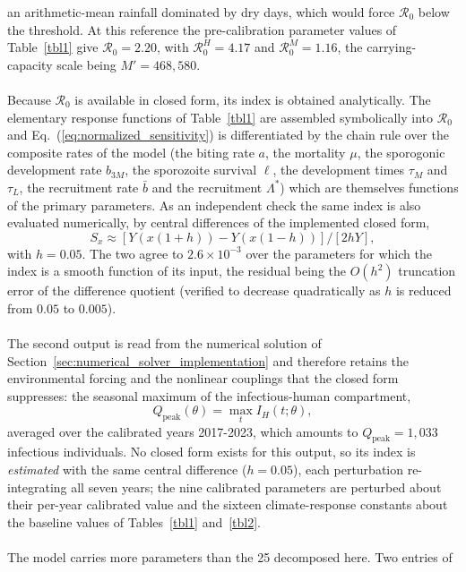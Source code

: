 \documentclass[a4paper,fleqn]{cas-dc}
\begin{document}
an arithmetic-mean rainfall dominated by dry days, which would force
$\mathcal{R}_0$ below the threshold. At this reference the pre-calibration
parameter values of Table~\ref{tbl1} give $\mathcal{R}_0 = 2.20$, with
$\mathcal{R}_0^H = 4.17$ and $\mathcal{R}_0^M = 1.16$, the
carrying-capacity scale being $M' = 468{,}580$.
\\\\
Because $\mathcal{R}_0$ is available in closed form, its index is obtained
analytically. The elementary response functions of
Table~\ref{tbl1} are assembled symbolically into $\mathcal{R}_0$ and
Eq.~(\ref{eq:normalized_sensitivity}) is differentiated by the chain rule
over the composite rates of the model (the biting rate $a$, the mortality
$\mu$, the sporogonic development rate $b_{3M}$, the sporozoite survival
$\ell$, the development times $\tau_M$ and $\tau_L$, the recruitment rate
$\bar{b}$ and the recruitment $\Lambda^*$) which are themselves functions
of the primary parameters. As an independent check the same index is also
evaluated numerically, by central differences of the implemented closed form,
$$S_x \approx [Y(x(1+h)) - Y(x(1-h))]/[2hY],$$ with $h = 0.05$. The two agree to
$2.6\times 10^{-3}$ over the parameters for which the index is a smooth
function of its input, the residual being the $O(h^2)$ truncation error of
the difference quotient (verified to decrease quadratically as $h$ is
reduced from $0.05$ to $0.005$).
\\\\
The second output is read from the numerical solution of
Section~\ref{sec:numerical_solver_implementation} and therefore retains the
environmental forcing and the nonlinear couplings that the closed form
suppresses: the seasonal maximum of the infectious-human compartment,
\begin{equation}
Q_{\mathrm{peak}}(\theta)=\max_{t} I_H(t;\theta),
\label{eq:qpeak}
\end{equation}
averaged over the calibrated years 2017-2023, which amounts to
$Q_{\mathrm{peak}} = 1{,}033$ infectious individuals. No closed form exists
for this output, so its index is \emph{estimated} with the same central
difference ($h = 0.05$), each perturbation re-integrating all seven years;
the nine calibrated parameters are perturbed about their per-year calibrated
value and the sixteen climate-response constants about the baseline values
of Tables~\ref{tbl1} and~\ref{tbl2}.
\\\\
The model carries more parameters than the 25 decomposed here. Two entries of
\end{document}
